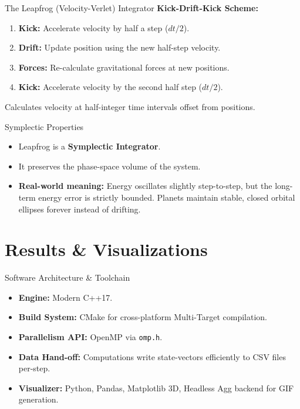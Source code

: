 \documentclass[aspectratio=169]{beamer}
\begin{document}
\begin{frame}{The Leapfrog (Velocity-Verlet) Integrator}
    \textbf{Kick-Drift-Kick Scheme:}
    \begin{enumerate}
        \item \textbf{Kick:} Accelerate velocity by half a step ($dt/2$).
        \item \textbf{Drift:} Update position using the new half-step velocity.
        \item \textbf{Forces:} Re-calculate gravitational forces at new positions.
        \item \textbf{Kick:} Accelerate velocity by the second half step ($dt/2$).
    \end{enumerate}
    Calculates velocity at half-integer time intervals offset from positions.
\end{frame}

\begin{frame}{Symplectic Properties}
    \begin{itemize}
        \item Leapfrog is a \textbf{Symplectic Integrator}.
        \item It preserves the phase-space volume of the system.
        \item \textbf{Real-world meaning:} Energy oscillates slightly step-to-step, but the long-term energy error is strictly bounded. Planets maintain stable, closed orbital ellipses forever instead of drifting.
    \end{itemize}
\end{frame}

\section{Results \& Visualizations}
\begin{frame}{Software Architecture \& Toolchain}
    \begin{itemize}
        \item \textbf{Engine:} Modern C++17.
        \item \textbf{Build System:} CMake for cross-platform Multi-Target compilation.
        \item \textbf{Parallelism API:} OpenMP via \texttt{omp.h}.
        \item \textbf{Data Hand-off:} Computations write state-vectors efficiently to CSV files per-step.
        \item \textbf{Visualizer:} Python, Pandas, Matplotlib 3D, Headless Agg backend for GIF generation.
    \end{itemize}
\end{frame}
\end{document}
